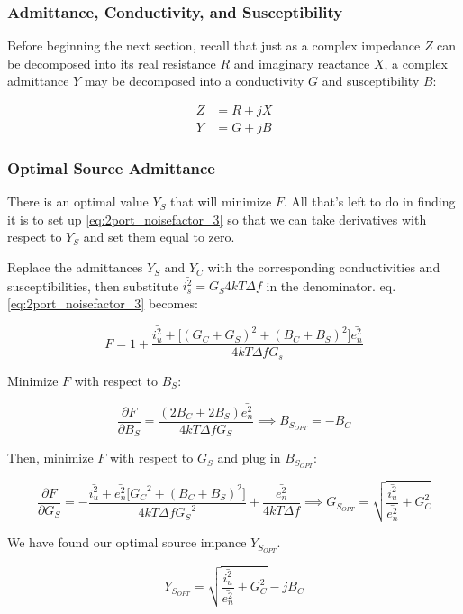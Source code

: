 \subsubsection{Admittance, Conductivity, and Susceptibility}
Before beginning the next section, recall that just as a complex impedance $Z$ can be decomposed into its real
resistance $R$ and imaginary reactance $X$, a complex admittance $Y$ may be decomposed into a conductivity $G$ and
susceptibility $B$:

\begin{equation}\label{eq:admittance}
    \begin{aligned}
        Z &= R + jX\\
        Y &= G + jB
    \end{aligned}
\end{equation}

\subsubsection{Optimal Source Admittance}
There is an optimal value $Y_S$ that will minimize $F$. All that's left to do in finding it is to set up
\ref{eq:2port_noisefactor_3} so that we can take derivatives with respect to $Y_S$ and set them equal to zero.

Replace the admittances $Y_S$ and $Y_C$ with the corresponding conductivities and susceptibilities, then substitute
$\bar{i_s^2} = G_S 4kT\Delta f$ in the denominator. eq. \ref{eq:2port_noisefactor_3} becomes:

\begin{equation}\label{eq:2port_noisefactor_4}
    F = 1 + \frac{\bar{i_u^2} + \big[(G_C+G_S)^2 + (B_C+B_S)^2\big] \bar{e_n^2}}{4kT \Delta f G_s}
\end{equation}

Minimize $F$ with respect to $B_S$:

\begin{equation}\label{eq:partial_B_S}
    \frac{\partial F}{\partial B_S} = \frac{(2 B_C + 2 B_S) \bar{e_n^2}}{4kT\Delta f G_S} \implies B_{S_{OPT}} = -B_C
\end{equation}

Then, minimize $F$ with respect to $G_S$ and plug in $B_{S_{OPT}}$:

\begin{equation}\label{eq:partial_G_S}
    \frac{\partial F}{\partial G_S} = -\frac{\bar{i_u^2} + \bar{e_n^2} \big[{G_C}^2 + (B_C+B_S)^2 \big]}{4kT\Delta f
    {G_S}^2} + \frac{\bar{e_n^2}}{4 kT\Delta f} \implies G_{S_{OPT}} = \sqrt{\frac{\bar{i_u^2}}{\bar{e_n^2}} + G_C^2}
\end{equation}

We have found our optimal source impance $Y_{S_{OPT}}$.

\begin{equation}\label{eq:y_opt}
    Y_{S_{OPT}} =  \sqrt{\frac{\bar{i_u^2}}{\bar{e_n^2}} + G_C^2} - j B_C
\end{equation}
